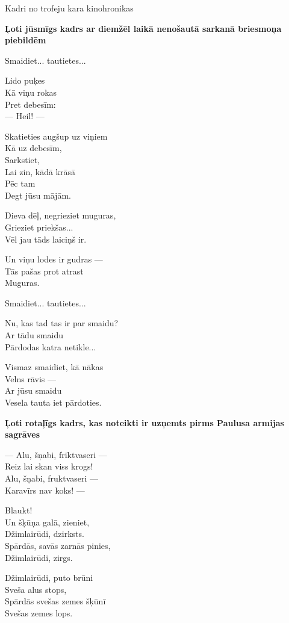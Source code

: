 \documentclass[14pt]{extarticle}
\begin{document}
\newpage

{\large \sc Kadri no trofeju kara kinohronikas}

{\bf Ļoti jūsmīgs kadrs ar diemžēl laikā 
nenošautā sarkanā briesmoņa piebildēm}

Smaidiet... tautietes...

Lido puķes\\
Kā viņu rokas\\
Pret debesīm:\\
--- Heil! ---

Skatieties augšup uz viņiem\\
Kā uz debesīm,\\
Sarkstiet,\\
Lai zin, kādā krāsā\\
Pēc tam\\
Degt jūsu mājām.

Dieva dēļ, negrieziet muguras,\\
Grieziet priekšas...\\
Vēl jau tāds laiciņš ir.

Un viņu lodes ir gudras ---\\
Tās pašas prot atrast\\
Muguras.

Smaidiet... tautietes...

Nu, kas tad tas ir par smaidu?\\
Ar tādu smaidu\\
Pārdodas katra netikle...

Vismaz smaidiet, kā nākas\\
Velns rāvis ---\\
Ar jūsu smaidu\\
Vesela tauta iet pārdoties.


\newpage

{\bf Ļoti rotaļīgs kadrs, kas noteikti ir uzņemts
pirms Paulusa armijas sagrāves}

--- Alu, šņabi, friktvaseri ---\\
Reiz lai skan viss krogs!\\
Alu, šņabi, fruktvaseri ---\\
Karavīrs nav koks! ---

Blaukt!\\
Un šķūņa galā, zieniet,\\
Džimlairūdi, dzirksts.\\
Spārdās, savās zarnās pinies,\\
Džimlairūdi, zirgs.

Džimlairūdi, puto brūni\\
Sveša alus stops,\\
Spārdās svešas zemes šķūnī\\
Svešas zemes lops.
\end{document}

